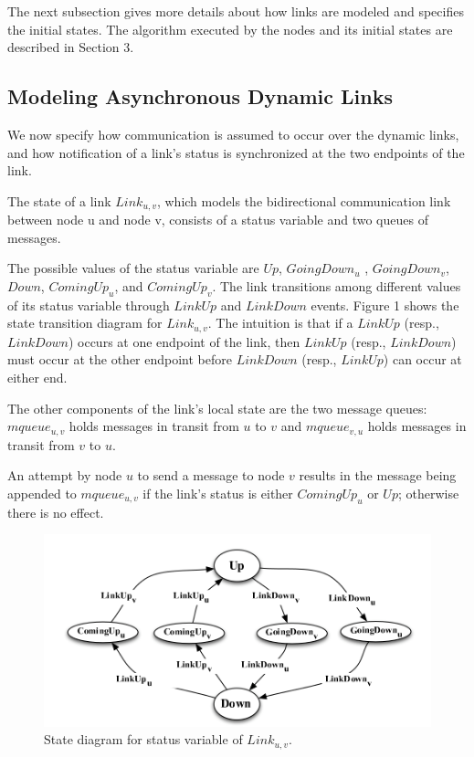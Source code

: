 \documentclass{article}
\begin{document}
The next subsection gives more details about how links are modeled and specifies the initial states. The algorithm executed by the nodes and its initial states are described in Section 3.
\subsection{Modeling Asynchronous Dynamic Links}
We now specify how communication is assumed to occur over the dynamic links, and how notification of a link’s status is synchronized at the two endpoints of the link.

The state of a link $Link_{u, v}$, which models the bidirectional communication link between node u and node v, consists of a status variable and two queues of messages.

The possible values of the status variable are $Up$, $GoingDown_{u}$ , $GoingDown_{v}$, $Down$, $ComingUp_{u}$, and $ComingUp_{v}$. The link transitions among different values of its status variable through $LinkUp$ and $LinkDown$ events. Figure 1 shows the state transition diagram for $Link_{u, v}$. The intuition is that if a $LinkUp$ (resp., $LinkDown$) occurs at one endpoint of the link, then $LinkUp$ (resp., $LinkDown$) must occur at the other endpoint before $LinkDown$ (resp., $LinkUp$) can occur at either end.

The other components of the link’s local state are the two message queues: $mqueue_{u,v}$ holds messages in transit from $u$ to $v$ and $mqueue_{v,u}$ holds messages in transit from $v$ to $u$.

An attempt by node $u$ to send a message to node $v$ results in the message being appended to $mqueue_{u,v}$ if the link’s status is either $ComingUp_u$ or $Up$; otherwise there is no effect.

\begin{figure}[hbtp]
\centering
\includegraphics[scale=.75]{screenshot.png}
\caption{State diagram for status variable of $Link_{u, v}$.}
\end{figure}
\end{document}
